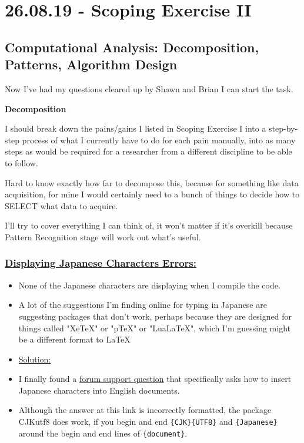 \documentclass[12pt]{article}
\begin{document}
\section{26.08.19 - Scoping Exercise II}
\subsection{Computational Analysis: Decomposition, Patterns, Algorithm Design}
Now I've had my questions cleared up by Shawn and Brian I can start the task. 

\textbf{Decomposition}

I should break down the pains/gains I listed in Scoping Exercise I into a step-by-step process of what I currently have to do for each pain manually, into as many steps as would be required for a researcher from a different discipline to be able to follow. 

Hard to know exactly how far to decompose this, because for something like data acquisition, for mine I would certainly need to a bunch of things to decide how to SELECT what data to acquire. 

I'll try to cover everything I can think of, it won't matter if it's overkill because Pattern Recognition stage will work out what's useful.

\newpage
\subsubsection{\underline{Displaying Japanese Characters Errors:}}\label{error:er11}
\begin{itemize}
    \item None of the Japanese characters are displaying when I compile the code.
    \item A lot of the suggestions I'm finding online for typing in Japanese are suggesting packages that don't work, perhaps because they are designed for things called "XeTeX" or "pTeX" or "LuaLaTeX", which I'm guessing might be a different format to LaTeX
\end{itemize}
\begin{itemize}
\renewcommand{\labelitemi}{$\nobullet$}
\item \underline{Solution:}
\renewcommand{\labelitemi}{$\bullet$}
    \item I finally found a \href{https://tex.stackexchange.com/questions/68333/how-to-put-japanese-kanji-characters-into-an-english-document}{forum support question} that specifically asks how to insert Japanese characters into English documents.
    \item Although the answer at this link is incorrectly formatted, the package CJKutf8 does work, if you begin and end \texttt{\{CJK\}\{UTF8\}} and \texttt{\{Japanese\}} around the begin and end lines of \texttt{\{document\}}.
\end{itemize}
\end{document}
